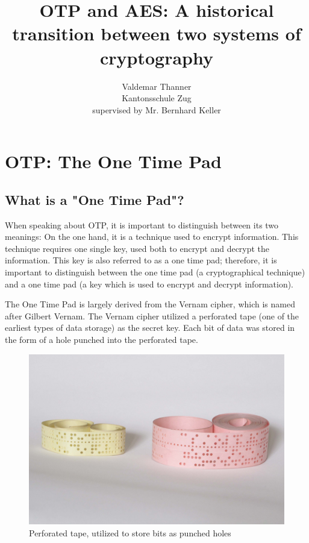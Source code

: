 \documentclass[12pt]{report}
\begin{document}
\title{OTP and AES: A historical transition between two systems of cryptography}
\author{Valdemar Thanner\\Kantonsschule Zug\\supervised by Mr. Bernhard Keller}
\maketitle

\tableofcontents

\chapter{OTP: The One Time Pad}

\section{What is a "One Time Pad"?}
When speaking about OTP, it is important to distinguish between its two meanings: On the one hand, it is a technique used to encrypt information. This technique requires one single key, used both to encrypt and decrypt the information. This key is also referred to as a one time pad; therefore, it is important to distinguish between the one time pad (a cryptographical technique) and a one time pad (a key which is used to encrypt and decrypt information).

The One Time Pad is largely derived from the Vernam cipher, which is named after Gilbert Vernam. The Vernam cipher utilized a perforated tape (one of the earliest types of data storage) as the secret key\cite{VernamPatent}. Each bit of data was stored in the form of a hole punched into the perforated tape.

\begin{figure}[H]
\centering
\includegraphics[scale=0.5]{PerforatedTape}
\caption{Perforated tape, utilized to store bits as punched holes}
\end{figure}
\end{document}
